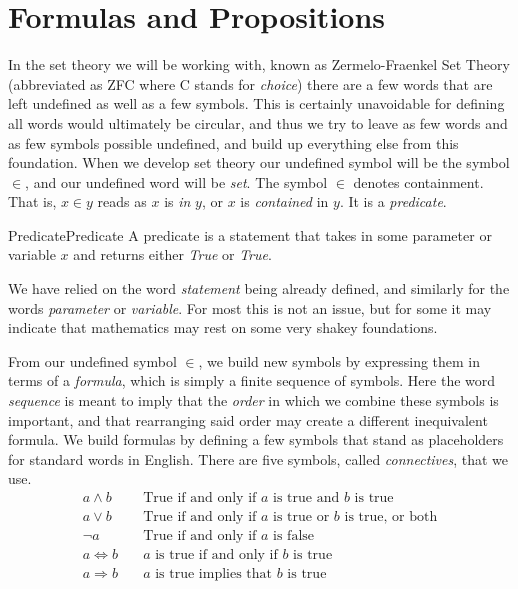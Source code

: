 \section{Formulas and Propositions}
    In the set theory we will be working with, known as
    Zermelo-Fraenkel Set Theory (abbreviated as ZFC where C stands for
    \textit{choice}) there are a few words that are left undefined as well as a
    few symbols. This is certainly unavoidable for defining all words would
    ultimately be circular, and thus we try to leave as few words and as few
    symbols possible undefined, and build up everything else from this
    foundation. When we develop set theory our undefined symbol will be
    the symbol $\in$, and our undefined word will be \textit{set}. The symbol
    $\in$ denotes containment. That is, $x\in{y}$ reads as $x$ is \textit{in}
    $y$, or $x$ is \textit{contained} in $y$. It is a
    \textit{\gls{predicate}}.
    \begin{fdefinition}{Predicate}{Predicate}
        A \gls{predicate} is a statement that takes in some parameter or
        variable $x$ and returns either \textit{True} or \textit{True}.
    \end{fdefinition}
    We have relied on the word \textit{statement} being already defined, and
    similarly for the words \textit{parameter} or \textit{variable}. For most
    this is not an issue, but for some it may indicate that mathematics may rest
    on some very shakey foundations.
    \par\hfill\par
    From our undefined symbol $\in$, we build new symbols by expressing them in
    terms of a \textit{formula}, which is simply a finite
    sequence of symbols. Here the word \textit{sequence} is meant to imply that
    the \textit{order} in which we combine these symbols is important, and that
    rearranging said order may create a different inequivalent formula. We build
    formulas by defining a few symbols that stand as placeholders for standard
    words in English. There are five symbols, called
    \textit{\glspl{connective}}, that we use.
    \begin{align*}
        a\land{b}\quad
        &\textrm{True if and only if }a
        \textrm{ is true and }b\textrm{ is true}
        \tag{Conjunction}\\
        a\lor{b}\quad
        &\textrm{True if and only if }a
        \textrm{ is true or }b\textrm{ is true, or both}
        \tag{Disjunction}\\
        \neg{a}\quad
        &\textrm{True if and only if }a\textrm{ is false}
        \tag{Negation}\\
        a\Leftrightarrow{b}\quad
        &a\textrm{ is true if and only if }b\textrm{ is true}
        \tag{Equivalence}\\
        a\Rightarrow{b}\quad
        &a\textrm{ is true implies that }b\textrm{ is true}
        \tag{Implication}
    \end{align*}
